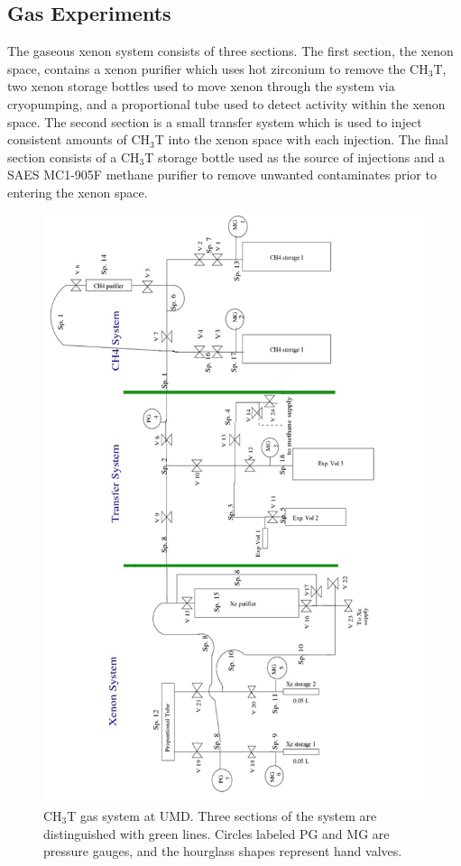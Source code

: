 \subsection{Gas Experiments}

The gaseous xenon system consists of three sections.  The first section, the xenon space, contains a xenon purifier which uses hot zirconium to remove the CH$_3$T, two xenon storage bottles used to move xenon through the system via cryopumping, and a proportional tube used to detect activity within the xenon space.  The second section is a small transfer system which is used to inject consistent amounts of CH$_3$T into the xenon space with each injection.  The final section consists of a CH$_3$T storage bottle used as the source of injections and a SAES MC1-905F methane purifier to remove unwanted contaminates prior to entering the xenon space.


\begin{figure}
\centering
\includegraphics[scale=0.3]{GasSystem.png}
\caption{CH$_3$T gas system at UMD.  Three sections of the system are distinguished with green lines. Circles labeled PG and MG are pressure gauges, and the hourglass shapes represent hand valves.}
\label{fig:GasSys}
\end{figure}


